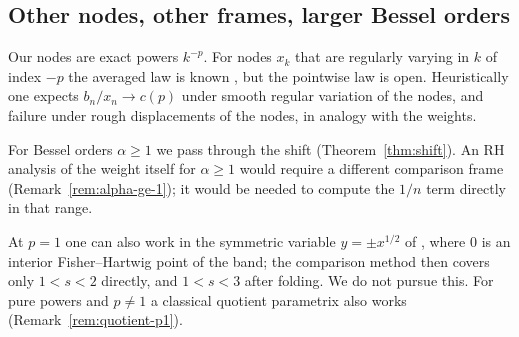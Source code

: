 \subsection{Other nodes, other frames, larger Bessel orders}\label{sec:nodes}\label{sec:p1-routes}
Our nodes are exact powers $k^{-p}$. For nodes $x_k$ that are regularly varying in $k$ of index $-p$ the averaged
law is known \cite{Paper1}, but the pointwise law is open. Heuristically one expects $b_n/x_n\to c(p)$ under smooth
regular variation of the nodes, and failure under rough displacements of the nodes, in analogy with the weights.

For Bessel orders $\alpha\ge1$ we pass through the shift (Theorem~\ref{thm:shift}). An RH analysis of the weight itself
for $\alpha\ge1$ would require a different comparison frame (Remark~\ref{rem:alpha-ge-1}); it would be needed to compute
the $1/n$ term directly in that range.

At $p=1$ one can also work in the symmetric variable $y=\pm x^{1/2}$ of \cite{WLXZ}, where $0$ is an interior
Fisher--Hartwig point of the band; the comparison method then covers only $1<s<2$ directly, and $1<s<3$ after folding.
We do not pursue this. For pure powers and $p\ne1$ a classical quotient parametrix also works
(Remark~\ref{rem:quotient-p1}).
